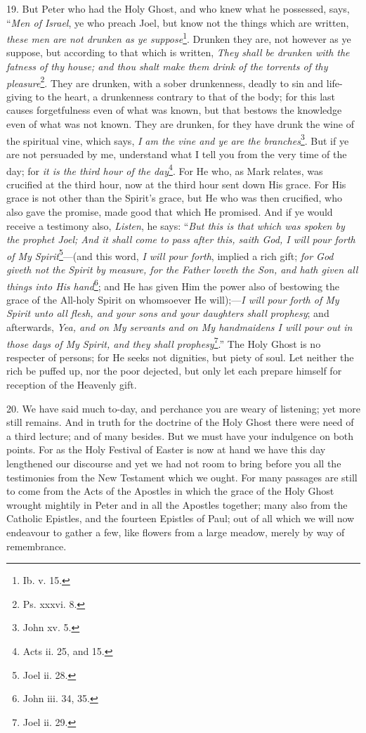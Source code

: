 19. But Peter who had the Holy Ghost, and who knew what he possessed, says, “\emph{Men of Israel}, ye who preach Joel, but know not the things which are written, \emph{these men are not drunken as ye suppose}\footnote{Ib. v. 15.}. Drunken they are, not however as ye suppose, but according to that which is written, \emph{They shall be drunken with the fatness of thy house; and thou shalt make them drink of the torrents of thy pleasure}\footnote{Ps. xxxvi. 8.}. They are drunken, with a sober drunkenness, deadly to sin and life-giving to the heart, a drunkenness contrary to that of the body; for this last causes forgetfulness even of what was known, but that bestows the knowledge even of what was not known. They are drunken, for they have drunk the wine of the spiritual vine, which says, \emph{I am the vine and ye} \emph{are the branches}\footnote{John xv. 5.}. But if ye are not persuaded by me, understand what I tell you from the very time of the day; for \emph{it is the third hour of the day}\footnote{Acts ii. 25, and 15.}. For He who, as Mark relates, was crucified at the third hour, now at the third hour sent down His grace. For His grace is not other than the Spirit’s grace, but He who was then crucified, who also gave the promise, made good that which He promised. And if ye would receive a testimony also, \emph{Listen}, he says: “\emph{But this is that which was spoken by the prophet Joel; And it shall come to pass after this, saith God, I will pour forth of My Spirit}\footnote{Joel ii. 28.}—(and this word, \emph{I will pour forth}, implied a rich gift; \emph{for God giveth not the Spirit by measure, for the Father loveth the Son, and hath given all things into His hand}\footnote{John iii. 34, 35.}; and He has given Him the power also of bestowing the grace of the All-holy Spirit on whomsoever He will);—\emph{I will pour forth of My Spirit unto all flesh, and your sons and your daughters shall prophesy}; and afterwards, \emph{Yea, and on My servants and on My handmaidens I will pour out in those days of My Spirit, and they shall prophesy}\footnote{Joel ii. 29.}.” The Holy Ghost is no respecter of persons; for He seeks not dignities, but piety of soul. Let neither the rich be puffed up, nor the poor dejected, but only let each prepare himself for reception of the Heavenly gift.

20. We have said much to-day, and perchance you are weary of listening; yet more still remains. And in truth for the doctrine of the Holy Ghost there were need of a third lecture; and of many besides. But we must have your indulgence on both points. For as the Holy Festival of Easter is now at hand we have this day lengthened our discourse and yet we had not room to bring before you all the testimonies from the New Testament which we ought. For many passages are still to come from the Acts of the Apostles in which the grace of the Holy Ghost wrought mightily in Peter and in all the Apostles together; many also from the Catholic Epistles, and the fourteen Epistles of Paul; out of all which we will now endeavour to gather a few, like flowers from a large meadow, merely by way of remembrance.

